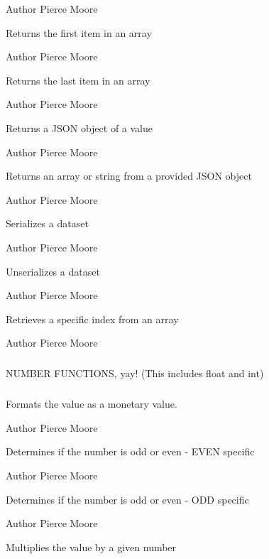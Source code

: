 \begin{DoxyAuthor}{Author}
Pierce Moore
\end{DoxyAuthor}
Returns the first item in an array

\begin{DoxyAuthor}{Author}
Pierce Moore
\end{DoxyAuthor}
Returns the last item in an array

\begin{DoxyAuthor}{Author}
Pierce Moore
\end{DoxyAuthor}
Returns a J\-S\-O\-N object of a value

\begin{DoxyAuthor}{Author}
Pierce Moore
\end{DoxyAuthor}
Returns an array or string from a provided J\-S\-O\-N object

\begin{DoxyAuthor}{Author}
Pierce Moore
\end{DoxyAuthor}
Serializes a dataset

\begin{DoxyAuthor}{Author}
Pierce Moore
\end{DoxyAuthor}
Unserializes a dataset

\begin{DoxyAuthor}{Author}
Pierce Moore
\end{DoxyAuthor}
Retrieves a specific index from an array

\begin{DoxyAuthor}{Author}
Pierce Moore
\end{DoxyAuthor}
\subparagraph*{}

\begin{DoxyVerb}                   NUMBER FUNCTIONS, yay! (This includes float and int)\end{DoxyVerb}
 \subparagraph*{}

Formats the value as a monetary value.

\begin{DoxyAuthor}{Author}
Pierce Moore
\end{DoxyAuthor}
Determines if the number is odd or even -\/ E\-V\-E\-N specific

\begin{DoxyAuthor}{Author}
Pierce Moore
\end{DoxyAuthor}
Determines if the number is odd or even -\/ O\-D\-D specific

\begin{DoxyAuthor}{Author}
Pierce Moore
\end{DoxyAuthor}
Multiplies the value by a given number

